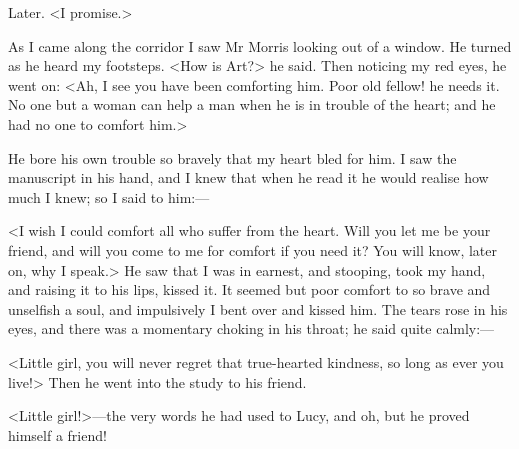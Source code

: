 \begin{diary}{Later.}
<I promise.>

As I came along the corridor I saw Mr Morris looking out of a window. He turned as he heard my footsteps. <How is Art?> he said. Then noticing my red eyes, he went on: <Ah, I see you have been comforting him. Poor old fellow! he needs it. No one but a woman can help a man when he is in trouble of the heart; and he had no one to comfort him.>

He bore his own trouble so bravely that my heart bled for him. I saw the manuscript in his hand, and I knew that when he read it he would realise how much I knew; so I said to him:—

<I wish I could comfort all who suffer from the heart. Will you let me be your friend, and will you come to me for comfort if you need it? You will know, later on, why I speak.> He saw that I was in earnest, and stooping, took my hand, and raising it to his lips, kissed it. It seemed but poor comfort to so brave and unselfish a soul, and impulsively I bent over and kissed him. The tears rose in his eyes, and there was a momentary choking in his throat; he said quite calmly:—

<Little girl, you will never regret that true-hearted kindness, so long as ever you live!> Then he went into the study to his friend.

<Little girl!>—the very words he had used to Lucy, and oh, but he proved himself a friend!
\end{diary}